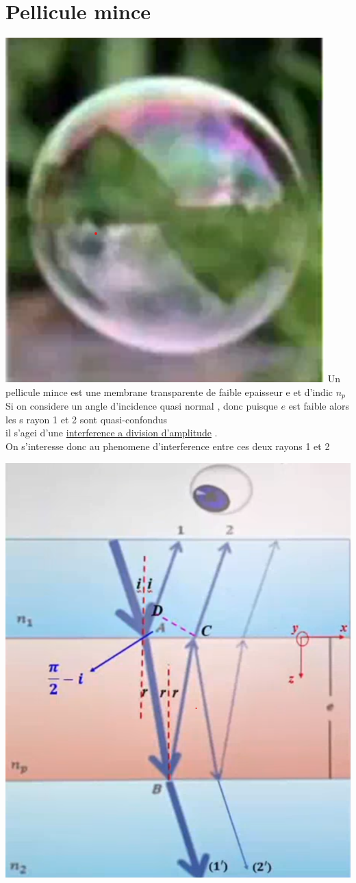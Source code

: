 \documentclass[12pt]{book}
\begin{document}
        \section{Pellicule mince}
            
            \begin{center}
                \begin{minipage}{0.59\linewidth}
                    \includegraphics[width=0.2\linewidth]{pic/buble.png}
                    Un pellicule mince est une membrane transparente de faible epaisseur e et d'indic $n_p$ \\
                    Si on considere un angle d'incidence quasi normal , donc puisque $e$ est faible alors les s rayon 1 et 2 sont quasi-confondus\\
                    il s'agei d'une \underline{interference a division d'amplitude} . \\
                    On s'interesse donc au phenomene d'interference entre ces deux rayons 1 et 2 \vspace*{15px}
                \end{minipage}
                \begin{minipage}{0.38\linewidth}
                    \includegraphics[width=\linewidth]{pic/pellicule.png}
                    
                \end{minipage}
            \end{center}
\end{document}
